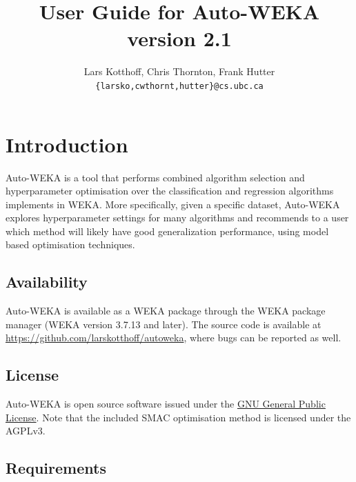 \documentclass{article}
\def\version{2.1}
\begin{document}
\title{User Guide for Auto-WEKA version \version}

\author{
Lars Kotthoff, Chris Thornton, Frank Hutter\\
\texttt{\{larsko,cwthornt,hutter\}@cs.ubc.ca}
}

\maketitle

\tableofcontents

\section{Introduction}\label{sec:intro}

Auto-WEKA is a tool that performs combined algorithm selection and hyperparameter
optimisation over the classification and regression algorithms implements in
WEKA. More specifically, given a specific dataset, Auto-WEKA explores
hyperparameter settings for many algorithms and recommends to a user which
method will likely have good generalization performance, using model based
optimisation techniques.

\subsection{Availability}

Auto-WEKA is available as a WEKA package through the WEKA package manager (WEKA
version 3.7.13 and later). The source code is available at
\url{https://github.com/larskotthoff/autoweka}, where bugs can be reported as
well.

\subsection{License}

Auto-WEKA is open source software issued under the
\href{http://www.gnu.org/licenses/gpl.html}{GNU General Public License}. Note
that the included SMAC optimisation method is licensed under the AGPLv3.

\subsection{Requirements}
\end{document}
